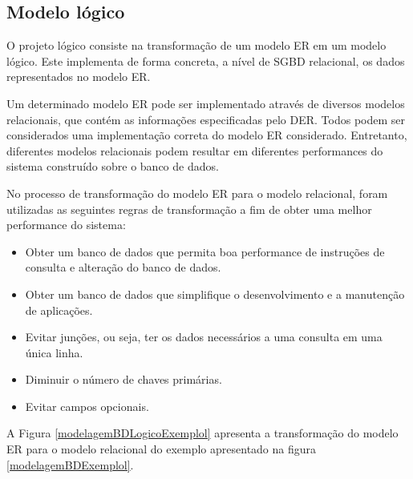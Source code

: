 \subsection{Modelo lógico}
\label{fundBDProjeto}

O projeto lógico consiste na transformação de um modelo ER em um modelo lógico. Este implementa de forma concreta, a nível de SGBD relacional, os dados representados no modelo ER.

Um determinado modelo ER pode ser implementado através de diversos modelos relacionais, que contém as informações especificadas pelo DER. Todos podem ser considerados uma implementação correta do modelo ER considerado. Entretanto, diferentes modelos relacionais podem resultar em diferentes performances do sistema construído sobre o banco de dados. 

No processo de transformação do modelo ER para o modelo relacional, foram utilizadas as seguintes regras de transformação \cite{heuser} a fim de obter uma melhor performance do sistema: 

\begin{itemize}
    \item Obter um banco de dados que permita boa performance de instruções de consulta e alteração do banco de dados.
    
    \item Obter um banco de dados que simplifique o desenvolvimento e a manutenção de aplicações.
    
    \item Evitar junções, ou seja, ter os dados necessários a uma consulta em uma única linha.
    
    \item Diminuir o número de chaves primárias.
    
    \item Evitar campos opcionais.
    
\end{itemize}

A Figura \ref{modelagemBDLogicoExemplol} apresenta a transformação do modelo ER para o modelo relacional do exemplo apresentado na figura \ref{modelagemBDExemplol}.

